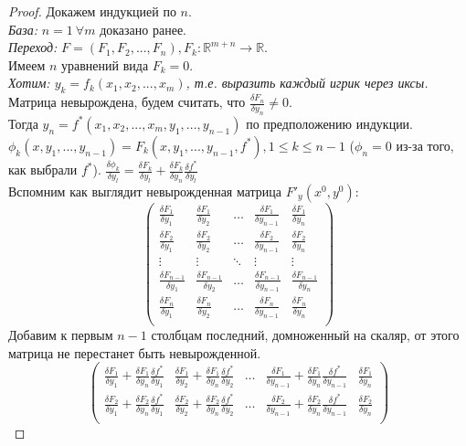 \documentclass{article}
\theoremstyle{indented}
\theoremstyle{definition}
\theoremstyle{remark}
\newcommand{\df}[2]{\frac{\delta #1}{\delta #2}}
\begin{document}
\begin{proof}
    Докажем индукцией по $n$.\\
    \textit{База: } $n=1 \ \forall m$ доказано ранее.\\
    \textit{Переход: } $F=(F_1, F_2, ... , F_n), F_k: \mathbb{R}^{m+n} \to \mathbb{R}$.\\
    Имеем $n$ уравнений вида $F_k = 0$.\\ 
    \textit{Хотим: $y_k=f_k(x_1, x_2, ..., x_m)$, т.е. выразить каждый игрик через иксы.}\\
    Матрица невырождена, будем считать, что $\frac{\delta F_n}{\delta y_n} \not= 0$.\\
    Тогда $y_n = f^*(x_1, x_2, ... , x_m, y_1, ... , y_{n-1})$
    по предположению индукции. \\
    $\phi_k(x,y_1, ..., y_{n-1}) = F_k(x,y_1, ..., y_{n-1}, f^*), 1 \leq k \leq n-1$ ($\phi_n = 0$ из-за того, как выбрали $f^*$).
    $\frac{\delta \phi_k}{\delta y_l} = \frac{\delta F_k}{\delta y_l} + \frac{\delta F_k}{\delta y_n} \frac{\delta f^*}{\delta y_l}$\\
    Вспомним как выглядит невырожденная матрица $F'_y(x^0, y^0)$:
    $$
    \begin{pmatrix}
        \df{F_1}{y_1} & \df{F_1}{y_2} &\ldots & \df{F_1}{y_{n-1}} & \df{F_1}{y_n}\\
        \df{F_2}{y_1} & \df{F_2}{y_2} &\ldots & \df{F_2}{y_{n-1}} & \df{F_2}{y_n}\\
        \vdots                        & \vdots                        &\ddots & \vdots                        &  \vdots                      \\
        \df{F_{n-1}}{y_1} & \df{F_{n-1}}{y_2} &\ldots & \df{F_{n-1}}{y_{n-1}} & \df{F_{n-1}}{y_n}\\
        \df{F_n}{y_1} & \df{F_n}{y_2} &\ldots & \df{F_n}{y_{n-1}} & \df{F_n}{y_n}\\
    \end{pmatrix}    
    $$
    Добавим к первым $n-1$ столбцам последний, домноженный на скаляр, от этого матрица не перестанет быть невырожденной.
    $$
    \begin{pmatrix}
        \df{F_1}{y_1} + \df{F_1}{y_n} \df{f^*}{y_1} & \df{F_1}{y_2} + \df{F_1}{y_n} \df{f^*}{y_2} &\ldots & \df{F_1}{y_{n-1}} + \df{F_1}{y_n} \df{f^*}{y_{n-1}} & \df{F_1}{y_n}\\
        \df{F_2}{y_1} + \df{F_2}{y_n} \df{f^*}{y_1} & \df{F_2}{y_2} + \df{F_2}{y_n} \df{f^*}{y_2} &\ldots & \df{F_2}{y_{n-1}} + \df{F_2}{y_n} \df{f^*}{y_{n-1}} & \df{F_2}{y_n}\\

\end{pmatrix}$$
\end{proof}
\end{document}
